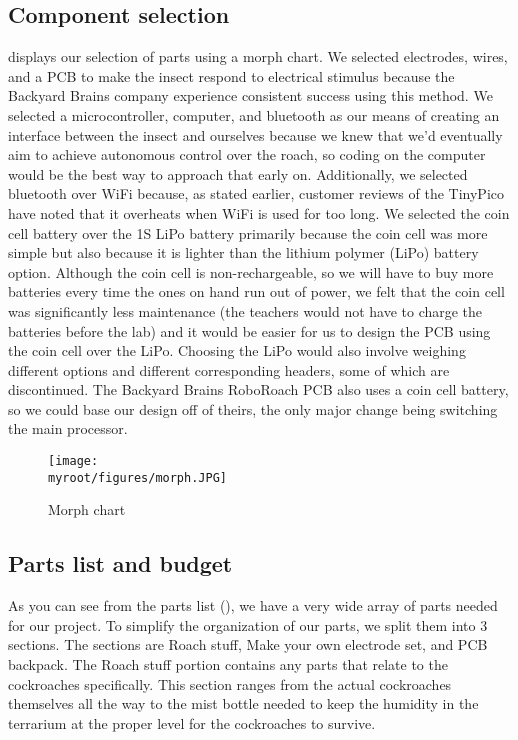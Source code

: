 \documentclass[twocolumn,10pt]{IEEEtran}
\newcommand{\myroot}{.}
\begin{document}
\subsection{Component selection}
 displays our selection of parts using a morph chart. We selected electrodes, wires, and a PCB to make the insect respond to electrical stimulus because the Backyard Brains company experience consistent success using this method. We selected a microcontroller, computer, and bluetooth as our means of creating an interface between the insect and ourselves because we knew that we'd eventually aim to achieve autonomous control over the roach, so coding on the computer would be the best way to approach that early on. Additionally, we selected bluetooth over WiFi because, as stated earlier, customer reviews of the TinyPico have noted that it overheats when WiFi is used for too long. We selected the coin cell battery over the 1S LiPo battery primarily because the coin cell was more simple but also because it is lighter than the lithium polymer (LiPo) battery option. Although the coin cell is non-rechargeable, so we will have to buy more batteries every time the ones on hand run out of power, we felt that the coin cell was significantly less maintenance (the teachers would not have to charge the batteries before the lab) and it would be easier for us to design the PCB using the coin cell over the LiPo. Choosing the LiPo would also involve weighing different options and different corresponding headers, some of which are discontinued. The Backyard Brains RoboRoach PCB also uses a coin cell battery, so we could base our design off of theirs, the only major change being switching the main processor.
\begin{figure}[ht!]
\centering
\texttt{[image: \\myroot/figures/morph.JPG]}
\caption{Morph chart}
\label{fig:morph}
\end{figure}

\subsection{Parts list and budget}
As you can see from the parts list (), we have a very wide array of parts needed for our project. To simplify the organization of our parts, we split them into 3 sections. The sections are Roach stuff, Make your own electrode set, and PCB backpack. The Roach stuff portion contains any parts that relate to the cockroaches specifically. This section ranges from the actual cockroaches themselves all the way to the mist bottle needed to keep the humidity in the terrarium at the proper level for the cockroaches to survive.
\end{document}
